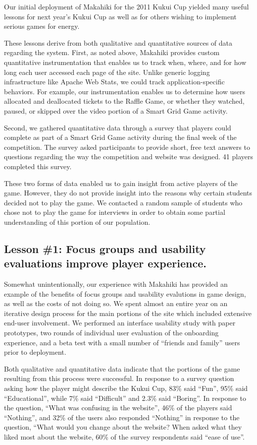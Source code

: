 \documentclass{acm_proc_article-sp}
\begin{document}
Our initial deployment of Makahiki for the 2011 Kukui Cup yielded many
useful lessons for next year's Kukui Cup as well as for others wishing to
implement serious games for energy. 

These lessons derive from both qualitative and quantitative sources of data
regarding the system.  First, as noted above, Makahiki provides custom quantitative
instrumentation that enables us to track when, where, and for how long each
user accessed each page of the site.  Unlike generic logging infrastructure
like Apache Web Stats, we could track application-specific behaviors. For
example, our instrumentation enables us to determine how users allocated
and deallocated tickets to the Raffle Game, or whether they watched,
paused, or skipped over the video portion of a Smart Grid Game activity.

Second, we gathered quantitative data through a survey that players could
complete as part of a Smart Grid Game activity during the final week of the
competition. The survey asked participants to provide short, free text
answers to questions regarding the way the competition and website was
designed.   41 players completed this survey.

These two forms of data enabled us to gain insight from active players of
the game.  However, they do not provide insight into the reasons why
certain students decided not to play the game.  We contacted a random
sample of students who chose not to play the game for interviews in order
to obtain some partial understanding of this portion of our population.

\subsection{Lesson \#1: Focus groups and usability evaluations improve player
  experience.}

Somewhat unintentionally, our experience with Makahiki has provided an
example of the benefits of focus groups and usability evalutions in game
design, as well as the costs of not doing so.  We spent almost an entire
year on an iterative design process for the main portions of the site which
included extensive end-user involvement.  We performed an interface
usability study with paper prototypes, two rounds of individual user
evaluation of the onboarding experience, and a beta test with a small
number of ``friends and family'' users prior to deployment.

Both qualitative and quantitative data indicate that the portions of the
game resulting from this process were successful.  In response to a survey
question asking how the player might describe the Kukui Cup, 83\% said
``Fun'', 95\% said ``Educational'', while 7\% said ``Difficult'' and 2.3\%
said ``Boring''.  In response to the question, ``What was confusing in the
website'', 46\% of the players said ``Nothing'', and 32\% of the users also
responded ``Nothing'' in response to the question, ``What would you change
about the website? When asked what they liked most about the website, 60\%
of the survey respondents said ``ease of use''.
\end{document}
